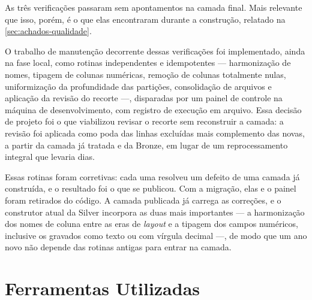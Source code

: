 As três verificações passaram sem apontamentos na camada final. Mais relevante que isso, porém, é o que elas encontraram durante a construção, relatado na \autoref{sec:achados-qualidade}.

O trabalho de manutenção decorrente dessas verificações foi implementado, ainda na fase local, como rotinas independentes e idempotentes --- harmonização de nomes, tipagem de colunas numéricas, remoção de colunas totalmente nulas, uniformização da profundidade das partições, consolidação de arquivos e aplicação da revisão do recorte ---, disparadas por um painel de controle na máquina de desenvolvimento, com registro de execução em arquivo. Essa decisão de projeto foi o que viabilizou revisar o recorte sem reconstruir a camada: a revisão foi aplicada como poda das linhas excluídas mais complemento das novas, a partir da camada já tratada e da Bronze, em lugar de um reprocessamento integral que levaria dias.

Essas rotinas foram corretivas: cada uma resolveu um defeito de uma camada já construída, e o resultado foi o que se publicou. Com a migração, elas e o painel foram retirados do código. A camada publicada já carrega as correções, e o construtor atual da Silver incorpora as duas mais importantes --- a harmonização dos nomes de coluna entre as eras de \textit{layout} e a tipagem dos campos numéricos, inclusive os gravados como texto ou com vírgula decimal ---, de modo que um ano novo não depende das rotinas antigas para entrar na camada.

\section{Ferramentas Utilizadas}


